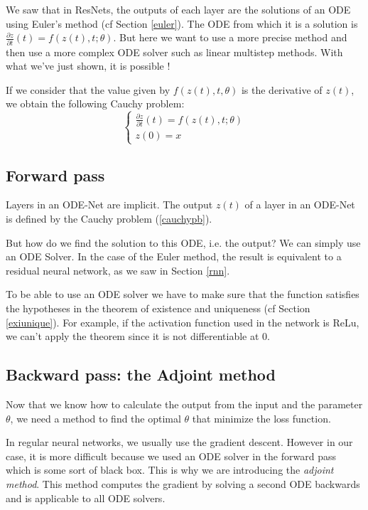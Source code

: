 \documentclass[10pt,a4paper]{article}
\theoremstyle{definition}
\theoremstyle{definition}
\theoremstyle{definition}
\begin{document}
We saw that in ResNets, the outputs of each layer are the solutions of an ODE using Euler's method (cf Section \ref{euler}). The ODE from which it is a solution is $\frac{\partial z}{\partial t}(t) = f(z(t),t;\theta)$. But here we want to use a more precise method and then use a more complex ODE solver such as linear multistep methods. With what we've just shown, it is possible !

If we consider that the value given by $f(z(t), t, \theta)$ is the derivative of $z(t)$, we obtain the following Cauchy problem:
\begin{equation}
\label{cauchypb}
\begin{cases}
\frac{\partial z}{\partial t}(t) =  f(z(t), t; \theta) \\
z(0) =  x
\end{cases}
\end{equation}


\subsection{Forward pass}

Layers in an ODE-Net are implicit. The output $z(t)$ of a layer in an ODE-Net is defined by the Cauchy problem (\ref{cauchypb}).

But how do we find the solution to this ODE, i.e. the output? We can simply use an ODE Solver. In the case of the Euler method, the result is equivalent to a residual neural network, as we saw in Section \ref{rnn}.

To be able to use an ODE solver we have to make sure that the function satisfies the hypotheses in the theorem of existence and uniqueness (cf Section \ref{exiunique}). For example, if the activation function used in the network is ReLu, we can't apply the theorem since it is not differentiable at $0$.

\subsection{Backward pass: the Adjoint method}
Now that we know how to calculate the output from the input and the parameter $\theta$, we need a method to find the optimal $\theta$ that minimize the loss function.

In regular neural networks, we usually use the gradient descent. However in our case, it is more difficult because we used an ODE solver in the forward pass which is some sort of black box. This is why we are introducing the \textit{adjoint method}. This method computes the gradient by solving a second ODE backwards and is applicable to all ODE solvers.
\end{document}
